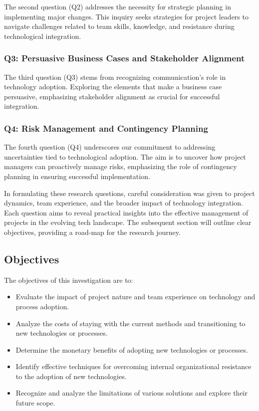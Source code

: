 \documentclass{article}
\begin{document}
The second question (Q2) addresses the necessity for strategic planning in implementing major changes. This inquiry seeks strategies for project leaders to navigate challenges related to team skills, knowledge, and resistance during technological integration.

\subsubsection*{Q3: Persuasive Business Cases and Stakeholder Alignment}

The third question (Q3) stems from recognizing communication’s role in technology adoption. Exploring the elements that make a business case persuasive, emphasizing stakeholder alignment as crucial for successful integration.

\subsubsection*{Q4: Risk Management and Contingency Planning}

The fourth question (Q4) underscores our commitment to addressing uncertainties tied to technological adoption. The aim is to uncover how project managers can proactively manage risks, emphasizing the role of contingency planning in ensuring successful implementation.
\newline

\noindent In formulating these research questions, careful consideration was given to project dynamics, team experience, and the broader impact of technology integration. Each question aims to reveal practical insights into the effective management of projects in the evolving tech landscape. The subsequent section will outline clear objectives, providing a road-map for the research journey.



\subsection{Objectives}

The objectives of this investigation are to:

\begin{itemize}
  \item Evaluate the impact of project nature and team experience on technology and process adoption.
  \item Analyze the costs of staying with the current methods and transitioning to new technologies or processes.
  \item Determine the monetary benefits of adopting new technologies or processes.
  \item Identify effective techniques for overcoming internal organizational resistance to the adoption of new technologies.
  \item Recognize and analyze the limitations of various solutions and explore their future scope.
\end{itemize}
\end{document}
